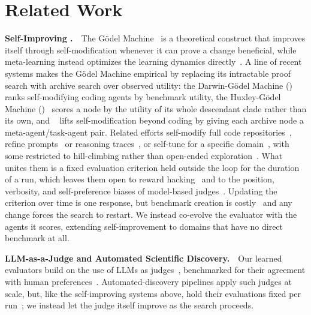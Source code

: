 \section{Related Work}
\label{sec:related}
\noindent\textbf{Self-Improving \AI.}~~The G\"odel Machine~\citep{good1966speculations,schmidhuber2003godel} is a theoretical construct that improves itself through self-modification whenever it can prove a change beneficial, while meta-learning instead optimizes the learning dynamics directly~\citep{kirsch2022eliminating,lu2023arbitrary}. A line of recent systems makes the G\"odel Machine empirical by replacing its intractable proof search with archive search over observed utility: the Darwin-G\"odel Machine (\dgm)~\citep{zhang2025darwin} ranks self-modifying coding agents by benchmark utility, the Huxley-G\"odel Machine (\hgm)~\citep{wang2025huxley} scores a node by the utility of its whole descendant clade rather than its own, and \hyperagents~\citep{zhang2026hyperagents} lifts self-modification beyond coding by giving each archive node a meta-agent/task-agent pair. Related efforts self-modify full code repositories~\citep{xia2025live,zelikman2024self,yin2025godel}, refine prompts~\citep{fernando2023promptbreeder} or reasoning traces~\citep{zelikman2022star}, or self-tune for a specific domain~\citep{shen2026star}, with some restricted to hill-climbing rather than open-ended exploration~\citep{robeyns2025self}. What unites them is a fixed evaluation criterion held outside the loop for the duration of a run, which leaves them open to reward hacking~\citep{skalse2022defining} and to the position, verbosity, and self-preference biases of model-based judges~\citep{zheng2023judging,dubois2024lengthcontrolled,DBLP:conf/nips/PanicksseryBF24}. Updating the criterion over time is one response, but benchmark creation is costly~\citep{DBLP:journals/corr/abs-2603-25681,DBLP:journals/corr/abs-2203-04592} and any change forces the search to restart. We instead co-evolve the evaluator with the agents it scores, extending self-improvement to domains that have no direct benchmark at all.

\noindent\textbf{LLM-as-a-Judge and Automated Scientific Discovery.}~~Our learned evaluators build on the use of LLMs as judges~\citep{zheng2023judging,zhuge2024agent}, benchmarked for their agreement with human preferences~\citep{zhao2026apres}. Automated-discovery pipelines apply such judges at scale, but, like the self-improving systems above, hold their evaluations fixed per run~\citep{lu2024ai,yamada2025ai,gottweis2025coscientist,ghareeb2026robin,novikov2025alphaevolve,romera2024mathematical}; we instead let the judge itself improve as the search proceeds.

